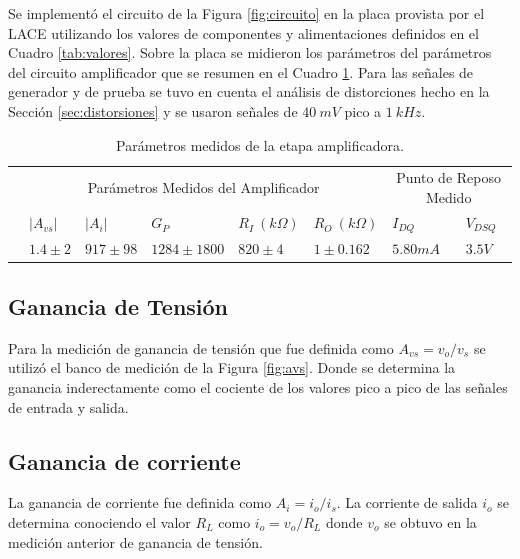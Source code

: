 \documentclass[a4paper, 10pt, spanish]{article}
\begin{document}
Se implementó el circuito de la Figura \ref{fig:circuito} en la placa provista por el LACE utilizando los valores de componentes y alimentaciones definidos en el Cuadro \ref{tab:valores}. Sobre la placa se midieron los parámetros del parámetros del circuito amplificador que se resumen en el Cuadro \ref{tab:mediciones}. Para las señales de generador y de prueba se tuvo en cuenta el análisis de distorciones hecho en la Sección \ref{sec:distorsiones} y se usaron señales de $40\ mV$ pico a $1\ kHz$.


\begin{table}[h]
\centering
\begin{tabularx}{0.9\textwidth}{XXXXXXXX}
\hline
\multicolumn{1}{c}{}				& \multicolumn{5}{c}{Parámetros Medidos del Amplificador}						& \multicolumn{2}{c}{Punto de Reposo Medido} \\
									\cmidrule(r){2-6}														\cmidrule(r){7-8}
\multicolumn{1}{c}{}				& $|A_{vs}|$  		& $|A_{i}|$ 		& $G_P$ 			& $R_I\ (k\Omega)$ & $R_O\ (k\Omega)$ 		& $I_{DQ}$ 			& $V_{DSQ}$			\\
									\cmidrule(r){2-2} \cmidrule(r){3-3} \cmidrule(r){4-4} 	\cmidrule(r){5-5} 	\cmidrule(r){6-6} \cmidrule(r){7-7} 	\cmidrule(r){8-8}
\multicolumn{1}{c}{}				& $1.4 \pm 2$	& $917 \pm 98$	& $1284 \pm 1800$ & $820 \pm 4 $ & $1 \pm 0.162 $ & $5.80mA$& $3.5V$\\
\hline
\end{tabularx}
\caption{Parámetros medidos de la etapa amplificadora.}
\label{tab:mediciones}
\end{table}



\subsection{Ganancia de Tensión}



Para la medición de ganancia de tensión que fue definida como $A_{vs} = v_o/v_s$ se utilizó el banco de medición de la Figura \ref{fig:avs}. Donde se determina la ganancia inderectamente como el cociente de los valores pico a pico de las señales de entrada y salida.




\subsection{Ganancia de corriente}

La ganancia de corriente fue definida como $A_i = i_o/ i_s$. La corriente de salida $i_o$ se determina conociendo el valor $R_L$ como $i_o = v_o/R_L$ donde $v_o$ se obtuvo en la medición anterior de ganancia de tensión.
\end{document}
